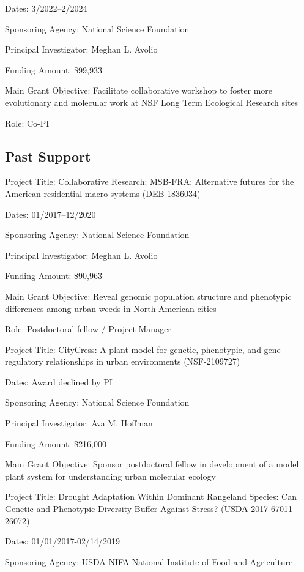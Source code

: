 \documentclass{cv}
\begin{document}
Dates: 3/2022--2/2024

Sponsoring Agency: National Science Foundation

Principal Investigator: Meghan L. Avolio

Funding Amount: \$99,933

Main Grant Objective: Facilitate collaborative workshop to foster more evolutionary and molecular work at NSF Long Term Ecological Research sites

Role: Co-PI

\subsection*{Past Support}

Project Title: Collaborative Research: MSB-FRA: Alternative futures for the American residential macro systems (DEB-1836034)

Dates: 01/2017--12/2020

Sponsoring Agency: National Science Foundation

Principal Investigator: Meghan L. Avolio

Funding Amount: \$90,963

Main Grant Objective: Reveal genomic population structure and phenotypic differences among urban weeds in North American cities

Role: Postdoctoral fellow / Project Manager

\vspace{5mm}

Project Title: CityCress: A plant model for genetic, phenotypic, and gene regulatory relationships in urban environments (NSF-2109727)

Dates: Award declined by PI

Sponsoring Agency: National Science Foundation

Principal Investigator: Ava M. Hoffman

Funding Amount: \$216,000

Main Grant Objective: Sponsor postdoctoral fellow in development of a model plant system for understanding urban molecular ecology

\vspace{5mm}

Project Title: Drought Adaptation Within Dominant Rangeland Species: Can Genetic and Phenotypic Diversity Buffer Against Stress? (USDA 2017-67011-26072)

Dates: 01/01/2017-02/14/2019

Sponsoring Agency: USDA-NIFA-National Institute of Food and Agriculture
\end{document}
